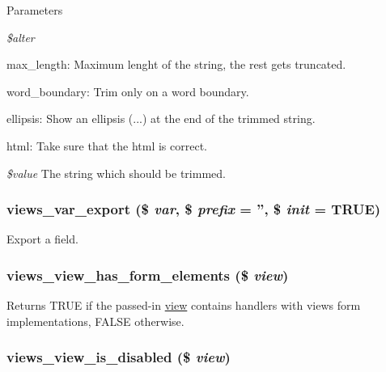 \begin{DoxyParams}{Parameters}
\item[{\em \$alter}]
\begin{DoxyItemize}
\item max\_\-length: Maximum lenght of the string, the rest gets truncated.
\item word\_\-boundary: Trim only on a word boundary.
\item ellipsis: Show an ellipsis (...) at the end of the trimmed string.
\item html: Take sure that the html is correct.
\end{DoxyItemize}\item[{\em \$value}]The string which should be trimmed. \end{DoxyParams}
\hypertarget{views_8module_af1114513b82cdc5613adc9dee41e11c7}{
\subsubsection[{views\_\-var\_\-export}]{\setlength{\rightskip}{0pt plus 5cm}views\_\-var\_\-export (\$ {\em var}, \/  \$ {\em prefix} = {\ttfamily ''}, \/  \$ {\em init} = {\ttfamily TRUE})}}
\label{views_8module_af1114513b82cdc5613adc9dee41e11c7}
Export a field. \hypertarget{views_8module_a5e3621086e4f50ae1e7cfe14392c6bca}{
\subsubsection[{views\_\-view\_\-has\_\-form\_\-elements}]{\setlength{\rightskip}{0pt plus 5cm}views\_\-view\_\-has\_\-form\_\-elements (\$ {\em view})}}
\label{views_8module_a5e3621086e4f50ae1e7cfe14392c6bca}
Returns TRUE if the passed-\/in \hyperlink{classview}{view} contains handlers with views form implementations, FALSE otherwise. \hypertarget{views_8module_afba08d9328467943ebfec0a583ecb214}{
\subsubsection[{views\_\-view\_\-is\_\-disabled}]{\setlength{\rightskip}{0pt plus 5cm}views\_\-view\_\-is\_\-disabled (\$ {\em view})}}
